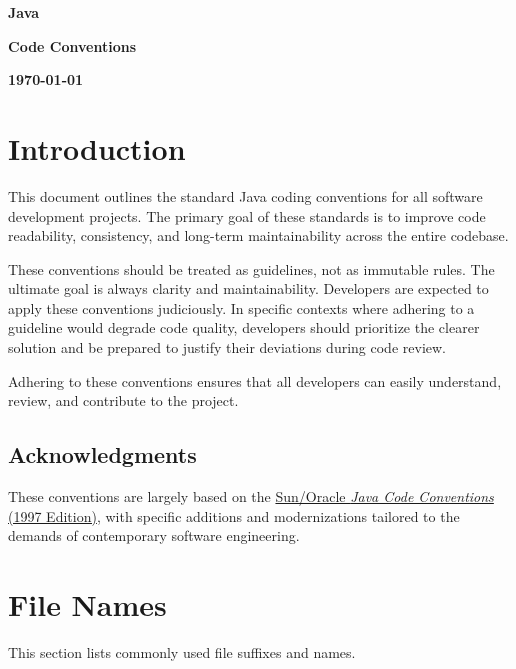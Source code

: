 \documentclass{article}
\begin{document}
\begin{titlepage}
  \centering
  \vspace*{0.33\textheight}
  {\Huge\bfseries Java\par}
  \vspace{0.5em}
  {\Huge\bfseries Code Conventions\par}
  \vspace{1.5em}
  {\large\bfseries \today\par}
  \vfill
\end{titlepage}

\tableofcontents
\clearpage

\section{Introduction}

This document outlines the standard Java coding conventions for all software development projects.
The primary goal of these standards is to improve code readability, consistency, and long-term
maintainability across the entire codebase.

These conventions should be treated as guidelines, not as immutable rules. The ultimate goal is
always clarity and maintainability. Developers are expected to apply these conventions judiciously.
In specific contexts where adhering to a guideline would degrade code quality, developers should
prioritize the clearer solution and be prepared to justify their deviations during code review.

Adhering to these conventions ensures that all developers can easily understand, review, and
contribute to the project.

\subsection{Acknowledgments}

These conventions are largely based on the
\href{https://www.oracle.com/docs/tech/java/codeconventions.pdf}{Sun/Oracle
\emph{Java Code Conventions} (1997 Edition)}, with specific additions and modernizations tailored to
the demands of contemporary software engineering.

\section{File Names}

This section lists commonly used file suffixes and names.
\end{document}
